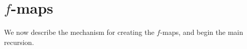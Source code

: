 \chapter{\texorpdfstring{\( f \)}{f}-maps}

We now describe the mechanism for creating the \( f \)-maps, and begin the main recursion.




